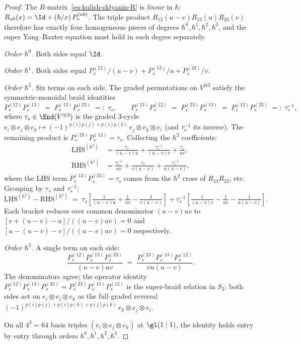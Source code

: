 \begin{proof}
The $R$-matrix~\eqref{eq:kulish-sklyanin-R} is \emph{linear} in
$\hbar$: $R_{ab}(x) = \Id + (\hbar/x)\, P_s^{(ab)}$. The triple
product $R_{12}(u-v)R_{13}(u)R_{23}(v)$ therefore has exactly four
homogeneous pieces of degrees $\hbar^0, \hbar^1, \hbar^2, \hbar^3$,
and the super Yang--Baxter equation must hold in each degree
separately.

\emph{Order $\hbar^0$.} Both sides equal $\Id$.

\emph{Order $\hbar^1$.} Both sides equal
$P_s^{(12)}/(u-v) + P_s^{(13)}/u + P_s^{(23)}/v$.

\emph{Order $\hbar^2$.} Six terms on each side. The graded
permutations on $V^{\otimes 3}$ satisfy the symmetric-monoidal
braid identities
\begin{equation}\label{eq:graded-braid-two-term}
 P_s^{(12)} P_s^{(13)} \;=\; P_s^{(13)} P_s^{(23)} \;=:\; \tau_s,
 \qquad
 P_s^{(13)} P_s^{(12)} \;=\; P_s^{(23)} P_s^{(13)} \;=\;
 P_s^{(12)} P_s^{(23)} \;=:\; \tau_s^{-1},
\end{equation}
where $\tau_s \in \End(V^{\otimes 3})$ is the graded 3-cycle
$e_i \otimes e_j \otimes e_k \mapsto
 (-1)^{p(i)p(j) + p(i)p(k)}\, e_j \otimes e_k \otimes e_i$
(and $\tau_s^{-1}$ its inverse). The remaining product is
$P_s^{(23)} P_s^{(12)} = \tau_s$.
Collecting the $\hbar^2$ coefficients:
\begin{align*}
 \text{LHS}^{(\hbar^2)}
 &= \frac{\tau_s}{(u-v)u} + \frac{\tau_s^{-1}}{(u-v)v}
 + \frac{\tau_s}{uv}, \\
 \text{RHS}^{(\hbar^2)}
 &= \frac{\tau_s^{-1}}{uv} + \frac{\tau_s}{v(u-v)}
 + \frac{\tau_s^{-1}}{u(u-v)},
\end{align*}
where the LHS term $P_s^{(13)}P_s^{(23)} = \tau_s$ comes from the
$\hbar^2$ cross of $R_{13}R_{23}$, etc. Grouping by $\tau_s$ and
$\tau_s^{-1}$:
\[
 \text{LHS}^{(\hbar^2)} - \text{RHS}^{(\hbar^2)}
 \;=\; \tau_s\left[\tfrac{1}{(u-v)u} + \tfrac{1}{uv}
 - \tfrac{1}{v(u-v)}\right]
 + \tau_s^{-1}\left[\tfrac{1}{(u-v)v} - \tfrac{1}{uv}
 - \tfrac{1}{u(u-v)}\right].
\]
Each bracket reduces over common denominator $(u-v)uv$ to
$[v + (u-v) - u]/((u-v)uv) = 0$ and
$[u - (u-v) - v]/((u-v)uv) = 0$ respectively.

\emph{Order $\hbar^3$.} A single term on each side:
\[
 \frac{P_s^{(12)} P_s^{(13)} P_s^{(23)}}{(u-v)uv}
 \;=\;
 \frac{P_s^{(23)} P_s^{(13)} P_s^{(12)}}{vu(u-v)}.
\]
The denominators agree; the operator identity
$P_s^{(12)} P_s^{(13)} P_s^{(23)} = P_s^{(23)} P_s^{(13)} P_s^{(12)}$
is the super-braid relation in $S_3$: both sides act on
$e_i \otimes e_j \otimes e_k$ as the full graded reversal
$(-1)^{p(i)p(j) + p(i)p(k) + p(j)p(k)}\, e_k \otimes e_j \otimes e_i$.

On all $4^3 = 64$ basis triples
$(e_i \otimes e_j \otimes e_k)$ at $\gl(1 \mid 1)$, the identity holds
entry by entry through orders $\hbar^0,\hbar^1,\hbar^2,\hbar^3$.
\end{proof}

